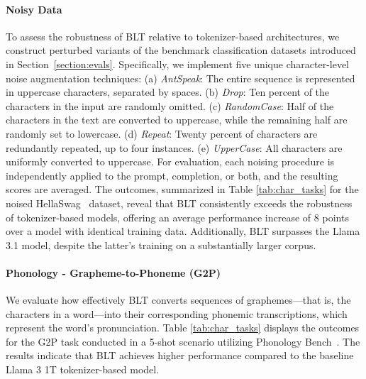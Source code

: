\paragraph{Noisy Data} To assess the robustness of {\textsc BLT} relative to tokenizer-based architectures, we construct perturbed variants of the benchmark classification datasets introduced in Section~\ref{section:evals}. Specifically, we implement five unique character-level noise augmentation techniques: (a) \textit{AntSpeak}: The entire sequence is represented in uppercase characters, separated by spaces. (b) \textit{Drop}: Ten percent of the characters in the input are randomly omitted. (c) \textit{RandomCase}: Half of the characters in the text are converted to uppercase, while the remaining half are randomly set to lowercase. (d) \textit{Repeat}: Twenty percent of characters are redundantly repeated, up to four instances. (e) \textit{UpperCase}: All characters are uniformly converted to uppercase. For evaluation, each noising procedure is independently applied to the prompt, completion, or both, and the resulting scores are averaged. The outcomes, summarized in Table \ref{tab:char_tasks} for the noised HellaSwag~\citep{Eval_hellaswag} dataset, reveal that {\textsc BLT} consistently exceeds the robustness of tokenizer-based models, offering an average performance increase of 8 points over a model with identical training data. Additionally, {\textsc BLT} surpasses the Llama 3.1 model, despite the latter's training on a substantially larger corpus.

\paragraph{Phonology - Grapheme-to-Phoneme (G2P)} We evaluate how effectively {\textsc BLT} converts sequences of graphemes—that is, the characters in a word—into their corresponding phonemic transcriptions, which represent the word’s pronunciation. Table \ref{tab:char_tasks} displays the outcomes for the G2P task conducted in a 5-shot scenario utilizing Phonology Bench~\citep{suvarna2024phonologybench}. The results indicate that {\textsc BLT} achieves higher performance compared to the baseline Llama 3 1T tokenizer-based model.

